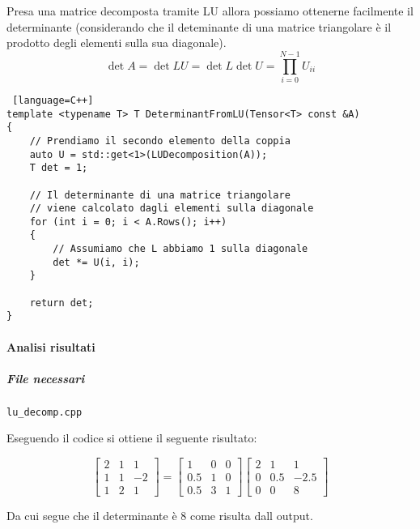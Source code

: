Presa una matrice decomposta tramite LU allora possiamo ottenerne facilmente il
determinante (considerando che il deteminante di una matrice triangolare è il prodotto
degli elementi sulla sua diagonale).
$$
	\det{A} = \det{LU} = \det{L} \det{U} = \prod_{i=0}^{N-1} U_{ii}
$$

\begin{lstlisting} [language=C++]
template <typename T> T DeterminantFromLU(Tensor<T> const &A)
{
    // Prendiamo il secondo elemento della coppia
    auto U = std::get<1>(LUDecomposition(A));
    T det = 1;

    // Il determinante di una matrice triangolare 
    // viene calcolato dagli elementi sulla diagonale
    for (int i = 0; i < A.Rows(); i++)
    {
        // Assumiamo che L abbiamo 1 sulla diagonale
        det *= U(i, i);
    }

    return det;
}
\end{lstlisting}

\paragraph{Analisi risultati}

\subparagraph{File necessari} \texttt{lu\_decomp.cpp}

Eseguendo il codice si ottiene il seguente risultato:

$$
    \begin{bmatrix}
        2 & 1 & 1  \\
        1 & 1 & -2 \\
        1 & 2 & 1
    \end{bmatrix} = \begin{bmatrix}
		1   & 0 & 0 \\
		0.5 & 1 & 0 \\
		0.5 & 3 & 1
	\end{bmatrix} \begin{bmatrix}
		2 & 1   & 1    \\
		0 & 0.5 & -2.5 \\
		0 & 0   & 8
	\end{bmatrix}
$$

Da cui segue che il determinante è 8 come risulta dall output.

